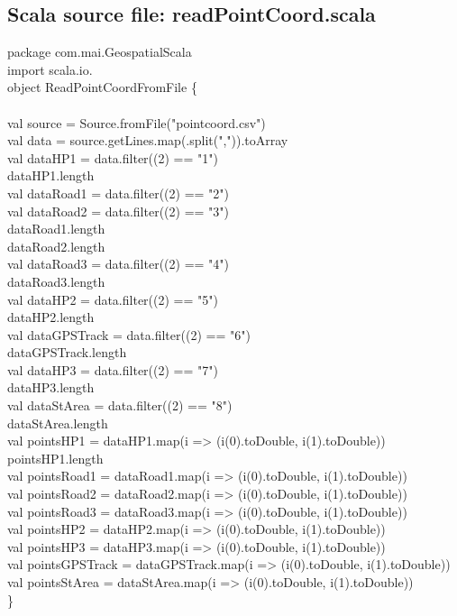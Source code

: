 \documentclass {article}
\begin{document}
\begin{appendices}
\section {Scala source file: readPointCoord.scala}
package com.mai.GeospatialScala\\
import scala.io.\underline{\space}\\
object ReadPointCoordFromFile \{ 
\\
\\
val source = Source.fromFile("pointcoord.csv")\\
val data = source.getLines.map(\underline{\space}.split(",")).toArray\\
val dataHP1 = data.filter(\underline{\space}(2) == "1")\\
dataHP1.length\\
val dataRoad1 = data.filter(\underline{\space}(2) == "2")\\
val dataRoad2 = data.filter(\underline{\space}(2) == "3")\\
dataRoad1.length\\
dataRoad2.length\\
val dataRoad3 = data.filter(\underline{\space}(2) == "4")\\
dataRoad3.length\\
val dataHP2 = data.filter(\underline{\space}(2) == "5")\\
dataHP2.length\\
val dataGPSTrack = data.filter(\underline{\space}(2) == "6")\\
dataGPSTrack.length\\
val dataHP3 = data.filter(\underline{\space}(2) == "7")\\
dataHP3.length\\
val dataStArea =  data.filter(\underline{\space}(2) == "8")\\
dataStArea.length\\
val pointsHP1 = dataHP1.map(i => (i(0).toDouble, i(1).toDouble))\\
pointsHP1.length\\
val pointsRoad1 = dataRoad1.map(i => (i(0).toDouble, i(1).toDouble))\\
val pointsRoad2 = dataRoad2.map(i => (i(0).toDouble, i(1).toDouble))\\
val pointsRoad3 = dataRoad3.map(i => (i(0).toDouble, i(1).toDouble))\\
val pointsHP2 = dataHP2.map(i => (i(0).toDouble, i(1).toDouble))\\
val pointsHP3 = dataHP3.map(i => (i(0).toDouble, i(1).toDouble)) \\
val pointsGPSTrack = dataGPSTrack.map(i => (i(0).toDouble, i(1).toDouble))\\
val pointsStArea = dataStArea.map(i => (i(0).toDouble, i(1).toDouble))\\
\}
\\
\\


\end{appendices}
\end{document}
